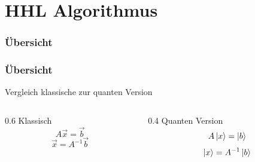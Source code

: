 \section{HHL Algorithmus}

\subsubsection{Übersicht}

    \begin{frame}
    \frametitle{Übersicht}
        Vergleich klassische zur quanten Version

        \hfil
        \begin{columns}[c]
            \begin{column}{0.6\hsize}\centering
            Klassisch
            $$A \vec{x} = \vec{b}$$
            $$\vec{x} = A^{-1}\vec{b}$$
            \end{column}

            \begin{column}{0.4\hsize}
            Quanten Version
            $$A \ket{x} = \ket{b}$$
            $$\ket{x} = A^{-1}\ket{b}$$
            \end{column}
        \end{columns}

    

    \end{frame}


